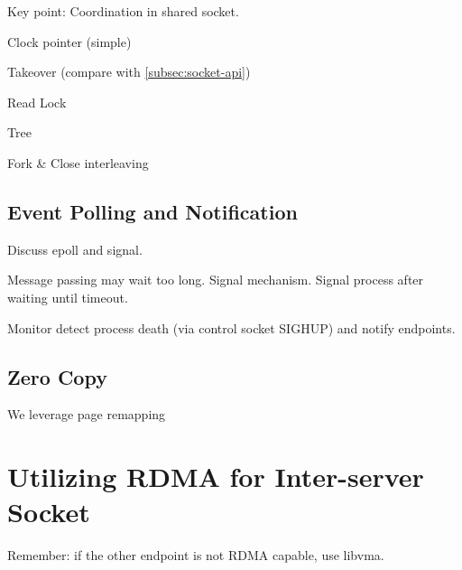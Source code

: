 Key point: Coordination in shared socket.

Clock pointer (simple)

Takeover (compare with \ref{subsec:socket-api})

Read Lock

Tree

Fork \& Close interleaving


\subsection{Event Polling and Notification}
\label{subsec:epoll}

Discuss epoll and signal.

Message passing may wait too long.
Signal mechanism. Signal process after waiting until timeout.

Monitor detect process death (via control socket SIGHUP) and notify endpoints.


\subsection{Zero Copy}
\label{subsec:zerocopy}

We leverage page remapping


\section{Utilizing RDMA for Inter-server Socket}
\label{sec:rdma}

Remember: if the other endpoint is not RDMA capable, use libvma.
